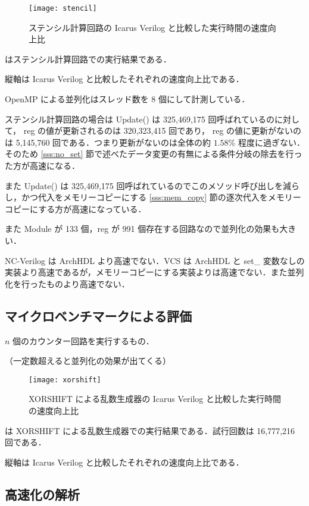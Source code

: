 \fi

\begin{figure}[t]
 \centering
 \texttt{[image: stencil]}
 \caption{ステンシル計算回路の Icarus Verilog と比較した実行時間の速度向上比}
 \label{fig:stencil}
\end{figure}

 はステンシル計算回路での実行結果である．

縦軸は Icarus Verilog と比較したそれぞれの速度向上比である．

OpenMP による並列化はスレッド数を 8 個にして計測している．

ステンシル計算回路の場合は Update() は 325,469,175
回呼ばれているのに対して， reg の値が更新されるのは 320,323,415
回であり， reg の値に更新がないのは 5,145,760
回である．つまり更新がないのは全体の約 $1.58\%$ 程度に過ぎない．そのため
\ref{sss:no_set}
節で述べたデータ変更の有無による条件分岐の除去を行った方が高速になる．

また Update() は 325,469,175
回呼ばれているのでこのメソッド呼び出しを減らし，かつ代入をメモリーコピーにする
\ref{sss:mem_copy}
節の逐次代入をメモリーコピーにする方が高速になっている．

また Module が 133 個，reg が 991
個存在する回路なので並列化の効果も大きい．

NC-Verilog は ArchHDL より高速でない．VCS は ArchHDL と set\_
変数なしの実装より高速であるが，メモリーコピーにする実装よりは高速でない．また並列化を行ったものより高速でない．

\subsection{マイクロベンチマークによる評価}

$n$ 個のカウンター回路を実行するもの．

（一定数超えると並列化の効果が出てくる）

\begin{figure}[t]
 \centering
 \texttt{[image: xorshift]}
 \caption{XORSHIFT による乱数生成器の Icarus Verilog と比較した実行時間の速度向上比}
 \label{fig:xorshift}
\end{figure}

 は XORSHIFT
による乱数生成器での実行結果である．試行回数は 16,777,216 回である．

縦軸は Icarus Verilog と比較したそれぞれの速度向上比である．

\subsection{高速化の解析}
